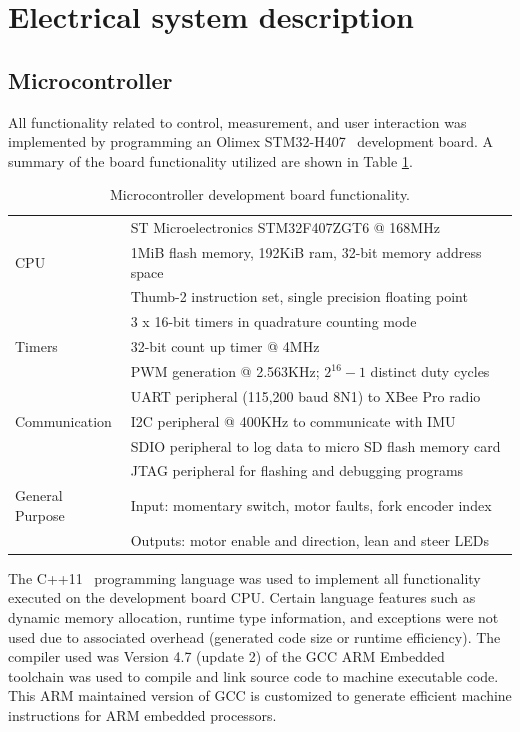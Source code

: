 \section{Electrical system description} \label{rb:sec:elec}
\subsection{Microcontroller} \label{rb:subsec:mcu} All functionality related to
control, measurement, and user interaction was implemented by programming an
Olimex STM32-H407~\cite{OlimexSTM32H407} development board. A summary of the
board functionality utilized are shown in Table \ref{rb:tab:mcu}.
\begin{table}[h]
  \centering
  \begin{tabular}{|l|l|}
    \hline
        & ST Microelectronics STM32F407ZGT6 @ 168MHz \\
    CPU & 1MiB flash memory, 192KiB ram, 32-bit memory address space \\
        & Thumb-2 instruction set, single precision floating point \\
    \hline
           & 3 x 16-bit timers in quadrature counting mode \\
    Timers & 32-bit count up timer @ 4MHz \\
           & PWM generation @ 2.563KHz; $2^{16} - 1$ distinct duty cycles \\
    \hline
                   & UART peripheral (115,200 baud 8N1) to XBee Pro radio \\
    Communication  & I2C peripheral @ 400KHz to communicate with IMU \\
                   & SDIO peripheral to log data to micro SD flash memory card \\
                   & JTAG peripheral for flashing and debugging programs \\
    \hline
    General Purpose & Input: momentary switch, motor faults, fork encoder index \\
                    & Outputs: motor enable and direction, lean and steer LEDs \\
    \hline
  \end{tabular}
  \caption{Microcontroller development board functionality.}
  \label{rb:tab:mcu}
\end{table}
The C++11~\cite{C++11} programming language was used to implement all
functionality executed on the development board CPU. Certain language features
such as dynamic memory allocation, runtime type information, and exceptions
were not used due to associated overhead (generated code size or runtime
efficiency). The compiler used was Version 4.7 (update 2) of the GCC ARM
Embedded~\cite{gccARMEmbedded} toolchain was used to compile and link source
code to machine executable code. This ARM maintained version of GCC is
customized to generate efficient machine instructions for ARM embedded
processors.

